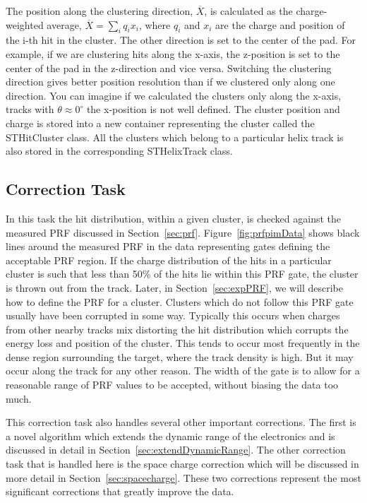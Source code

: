  The position along the clustering direction, $\overline{X}$, is calculated as the charge-weighted average, $\overline{X} = \sum_i q_ix_i$, where $q_i$ and $x_i$ are the charge and position of the i-th hit in the cluster. The other direction is set to the center of the pad. For example, if we are clustering hits along the x-axis, the z-position is set to the center of the pad in the z-direction and vice versa. Switching the clustering direction gives better position resolution than if we clustered only along one direction. You can imagine if we calculated the clusters only along the x-axis, tracks with $\theta \approx 0^{\circ}$ the x-position is not well defined. The cluster position and charge is stored into a new container representing the cluster called the STHitCluster class. All the clusters which belong to a particular helix track is also stored in the corresponding STHelixTrack class. 

\subsection{Correction Task}
\label{sec:corrTask}
In this task the hit distribution, within a given cluster, is checked against the measured PRF discussed in Section~\ref{sec:prf}. Figure~\ref{fig:prfpimData} shows black lines around the measured PRF in the data representing gates defining the acceptable PRF region. If the charge distribution of the hits in a particular cluster is such that less than 50\% of the hits lie within this PRF gate, the cluster is thrown out from the track. Later, in Section~\ref{sec:expPRF}, we will describe how to define the PRF for a cluster. Clusters which do not follow this PRF gate usually have been corrupted in some way. Typically this occurs when charges from other nearby tracks mix distorting the hit distribution which corrupts the energy loss and position of the cluster. This tends to occur most frequently in the dense region surrounding the target, where the track density is high. But it may occur along the track for any other reason. The width of the gate is to allow for a reasonable range of PRF values to be accepted, without biasing the data too much.   


This correction task also handles several other important corrections. The first is a novel algorithm which extends the dynamic range of the electronics and is discussed in detail in Section~\ref{sec:extendDynamicRange}. The other correction task that is handled here is the space charge correction which will be discussed in more detail in Section~\ref{sec:spacecharge}. These two corrections represent the most significant corrections that greatly improve the data. 

